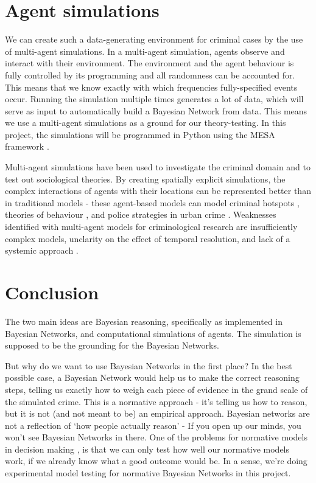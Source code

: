 \section{Agent simulations}
We can create such a data-generating environment for criminal cases by the use of multi-agent simulations. In a multi-agent simulation, agents observe and interact with their environment. The environment and the agent behaviour is fully controlled by its programming and all randomness can be accounted for. This means that we know exactly with which frequencies fully-specified events occur. Running the simulation multiple times generates a lot of data, which will serve as input to automatically build a Bayesian Network from data. This means we use a multi-agent simulations as a ground for our theory-testing. In this project, the simulations will be programmed in Python using the MESA framework  \citep{mesa2020}.


Multi-agent simulations have been used to investigate the criminal domain and to test out sociological theories. By creating spatially explicit simulations, the complex interactions of agents with their locations can be represented better than in traditional models - these agent-based models can model criminal hotspots \citep{Gerritsen2008}, theories of behaviour \citep{Gerritsen2015}, and police strategies in urban crime \citep{Zhu2021}. Weaknesses identified with multi-agent models for criminological research are insufficiently complex models, unclarity on the effect of temporal resolution, and lack of a systemic approach \citep{Zhu2021}.



 \section{Conclusion}

The two main ideas are Bayesian reasoning, specifically as implemented in Bayesian Networks, and computational simulations of agents. The simulation is supposed to be the grounding for the Bayesian Networks.

But why do we want to use Bayesian Networks in the first place? In the best possible case, a Bayesian Network would help us to make the correct reasoning steps, telling us exactly how to weigh each piece of evidence in the grand scale of the simulated crime. This is a normative approach - it's telling us how to reason, but it is not (and not meant to be) an empirical approach. Bayesian networks are not a reflection of `how people actually reason' - If you open up our minds, you won't see Bayesian Networks in there. One of the problems for normative models in decision making \citep{colyvan2013}, is that we can only test how well our normative models work, if we already know what a good outcome would be. In a sense, we're doing experimental model testing for normative Bayesian Networks in this project.



